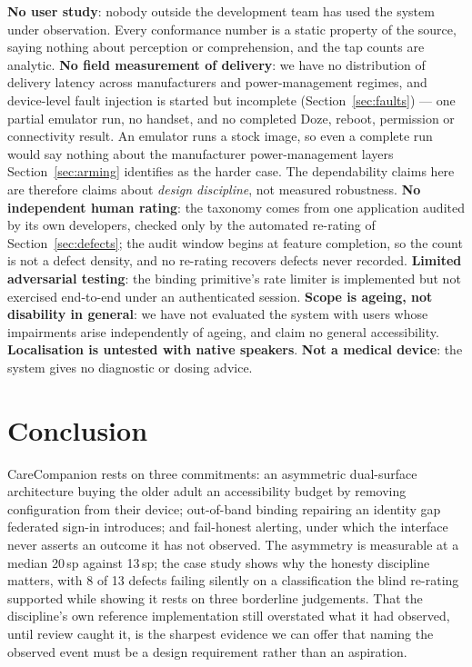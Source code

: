 \documentclass[runningheads,a4paper]{llncs}
\begin{document}
\textbf{No user study}: nobody outside the development team has used the system under
observation. Every
conformance number is a static property of the source, saying nothing about perception or
comprehension, and the tap counts are analytic. \textbf{No field measurement of delivery}:
we have no distribution of delivery latency across manufacturers and power-management
regimes, and device-level fault injection is started but incomplete
(Section~\ref{sec:faults}) --- one partial emulator run, no handset, and no completed Doze,
reboot, permission or connectivity result. An emulator runs a stock image, so even a
complete run would say nothing about the manufacturer power-management layers
Section~\ref{sec:arming} identifies as the harder case. The dependability claims here are
therefore claims about \emph{design discipline}, not measured robustness. \textbf{No
independent human rating}: the taxonomy comes from one application audited by its own
developers, checked only by the automated re-rating of Section~\ref{sec:defects}; the audit
window begins at feature completion, so the count is not a defect density, and no re-rating
recovers defects never recorded. \textbf{Limited adversarial testing}: the binding
primitive's rate limiter is implemented but not exercised end-to-end under an authenticated
session. \textbf{Scope is ageing, not disability in general}: we have not evaluated the
system with users whose impairments arise independently of ageing, and claim no general
accessibility. \textbf{Localisation is untested with native speakers}. \textbf{Not a
medical device}: the system gives no diagnostic or dosing advice.

\section{Conclusion}

CareCompanion rests on three commitments: an asymmetric dual-surface architecture buying the
older adult an accessibility budget by removing configuration from their device; out-of-band
binding repairing an identity gap federated sign-in introduces; and fail-honest alerting,
under which the interface never asserts an outcome it has not observed. The asymmetry is
measurable at a median 20\,sp against 13\,sp; the case study shows why the honesty
discipline matters, with 8 of 13 defects failing silently on a classification the blind
re-rating supported while showing it rests on three borderline judgements. That the
discipline's own reference implementation still overstated what it had observed, until
review caught it, is the sharpest evidence we can offer that naming the observed event must
be a design requirement rather than an aspiration.
\end{document}
